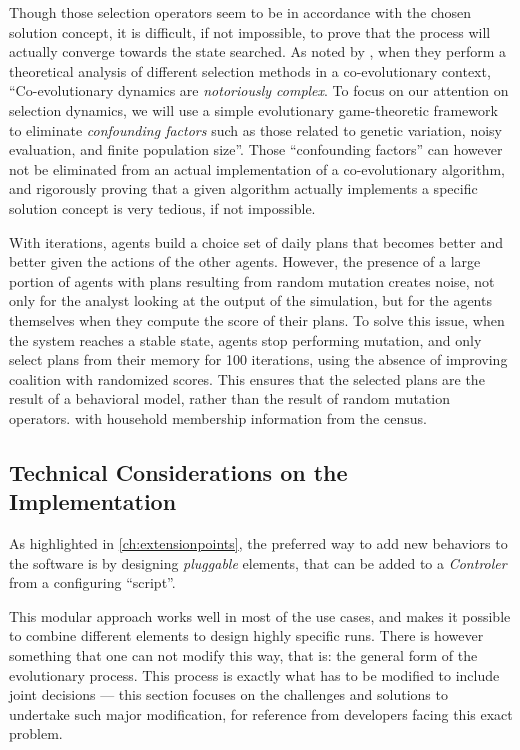 {Though those selection operators seem to be in accordance with the
chosen solution concept, it is difficult, if not impossible, to prove
that the process will actually converge towards the state searched. As
noted by \cite{FiciciEtAl_ITEC_2005}, when they perform a theoretical
analysis of different selection methods in a co-evolutionary context,
``Co-evolutionary dynamics are \emph{notoriously complex}. To focus on
our attention on selection dynamics, we will use a simple evolutionary
game-theoretic framework to eliminate \emph{confounding factors} such as
those related to genetic variation, noisy evaluation, and finite
population size''. Those ``confounding factors'' can however not be
eliminated from an actual implementation of a co-evolutionary algorithm,
and rigorously proving that a given algorithm actually implements a
specific solution concept is very tedious, if not impossible.

With iterations, agents build a choice set of daily plans that becomes
better and better given the actions of the other agents. However, the
presence of a large portion of agents with plans resulting from random
mutation creates noise, not only for the analyst looking at the output
of the simulation, but for the agents themselves when they compute the
score of their plans. To solve this issue, when the system reaches a
stable state, agents stop performing mutation, and only select plans
from their memory for 100 iterations, using the absence of improving
coalition with randomized scores. This ensures that the selected plans
are the result of a behavioral model, rather than the result of random
mutation operators.
with household membership information from the census.

\subsection{Technical Considerations on the Implementation}
As highlighted in \cref{ch:extensionpoints},
the preferred way to add new behaviors to the \matsim software is
by designing \emph{pluggable} elements,
that can be added to a \emph{Controler} from a configuring ``script''.

This modular approach works well in most of the use cases,
and makes it possible to combine different elements to design highly
specific runs.
There is however something that one can not modify this way,
that is: the general form of the evolutionary process.
This process is exactly what has to be modified to include joint decisions
--- 
this section focuses on the challenges and solutions to undertake such major
modification, for reference from developers facing this exact problem.

}
